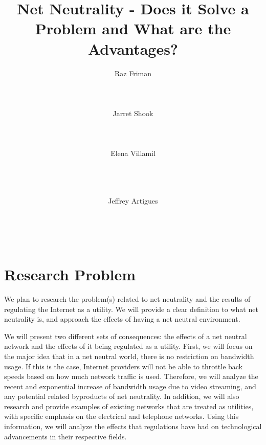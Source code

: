 \documentclass{sigcomm-alternate}
\begin{document}
\title{Net Neutrality - Does it Solve a Problem and What are the Advantages?}
	

\author{
	\alignauthor
	Raz Friman\\
	\\
	\\
	\\
	\alignauthor
	Jarret Shook\\
	\\
	\\
	\\
	\alignauthor Elena Villamil\\
	\\
	\\
	\\
	\and  %
	\alignauthor Jeffrey Artigues\\
	\\
	\\
	\\
}

\maketitle


\section{Research Problem}
We plan to research the problem(s) related to net neutrality and the results of regulating the Internet as a utility. We will provide a clear definition to what net neutrality is, and approach the effects of having a net neutral environment. 

We will present two different sets of consequences: the effects of a net neutral network and the effects of it being regulated as a utility. First, we will focus on the major idea that in a net neutral world, there is no restriction on bandwidth usage. If this is the case, Internet providers will not be able to throttle back speeds based on how much network traffic is used. Therefore, we will analyze the recent and exponential increase of bandwidth usage due to video streaming, and any potential related byproducts of net neutrality. In addition, we will also research and provide examples of existing networks that are treated as utilities, with specific emphasis on the electrical and telephone networks. Using this information, we will analyze the effects that regulations have had on technological advancements in their respective fields. 
\end{document}
